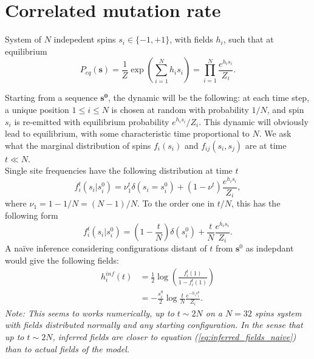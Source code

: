 \documentclass[10pt]{article}
\begin{document}
\section{Correlated mutation rate} %
\label{sec:correlated_mutation_rate}

System of $N$ indepedent spins $s_i\in\{-1,+1\}$, with fields $h_i$, such that at equilibrium
\begin{equation}
	\label{eq:Eq_distribution}
	P_{eq}(\mathbf{s}) = \frac{1}{Z}\exp\left(\sum_{i=1}^N h_i s_i \right) = \prod_{i=1}^N\frac{e^{h_i s_i}}{Z_i}.
\end{equation}

Starting from a sequence $\mathbf{s^0}$, the dynamic will be the following: at each time step, a unique position $1\leq i\leq N$ is chosen at random with probability $1/N$, and spin $s_i$ is re-emitted with equilibrium probability $e^{h_is_i}/Z_i$. This dynamic will obviously lead to equilibrium, with some characteristic time proportional to $N$. We ask what the marginal distribution of spins $f_i(s_i)$ and $f_{ij}(s_i,s_j)$ are at time $t\ll N$. \\

Single site frequencies have the following distribution at time $t$
\begin{equation}
	f_i^t(s_i\vert s_i^0) = \nu_1^t\delta(s_i=s_i^0) + (1-\nu^t)\frac{e^{h_is_i}}{Z_i},
\end{equation}
where $\nu_1=1-1/N=(N-1)/N$. To the order one in $t/N$, this has the following form 
\begin{equation}
	f_i^t(s_i\vert s_i^0) = \left(1-\frac{t}{N}\right)\delta(s_i^0) + \frac{t}{N}\frac{e^{h_is_i}}{Z_i}.
\end{equation}
A naïve inference considering configurations distant of $t$ from $\mathbf{s}^0$ as indepdant would give the following fields:
\begin{equation}
	\label{eq:inferred_fields_naive}
	\begin{split}
		h_i^{inf}(t) &= \frac{1}{2}\log\left(\frac{f_i^t(1)}{1-f_i^t(1)}\right)\\
					 &= -\frac{s_i^0}{2}\log\frac{t}{N}\frac{e^{-h_is_i^0}}{Z_i}.
	\end{split}
\end{equation}
\emph{Note: This seems to works numerically, up to $t\sim 2N$ on a $N=32$ spins system with fields distributed normally and any starting configuration. In the sense that up to $t\sim 2N$, inferred fields are closer to equation (\ref{eq:inferred_fields_naive}) than to actual fields of the model.}\\
\end{document}
